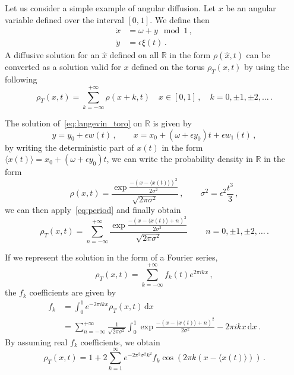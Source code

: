 Let us consider a simple example of angular diffusion. Let \(x\) be an angular variable defined over the interval \([0,1]\). We define then
\begin{equation}
	\begin{aligned}
		\dot{x} &= \omega + y \mod{1}\,, \\
		\dot{y} &= \epsilon\xi(t)	\,.
	\end{aligned}
	\label{eq:langevin_toro}
\end{equation}
A diffusive solution for an \(\hat{x}\) defined on all \(\mathbb{R}\) in the form \(\rho(\hat{x},t)\) can be converted as a solution valid for \(x\) defined on the torus \(\rho_T(x,t)\) by using the following 
\begin{equation}
	\rho_T(x,t) = \sum_{k=-\infty}^{+\infty} \rho(x+k,t) \quad x\in[0,1]\,,\quad k = 0,\pm 1, \pm 2, \ldots \,.
 \label{eq:period}
\end{equation}

The solution of~\eqref{eq:langevin_toro} on \(\mathbb{R}\) is given by
\begin{equation}
	y = y_0 + \epsilon w(t)\,, \qquad x = x_0 + (\omega + \epsilon y_0) t + \epsilon w_1(t) \,,
\end{equation}
by writing the deterministic part of \(x(t)\) in the form \(\langle x(t) \rangle = x_0 + (\omega + \epsilon y_0) t\), we can write the probability density in \(\mathbb{R}\) in the form
\begin{equation}
	\rho(x,t) = \frac{\exp{\frac{-(x-\langle x(t)\rangle)^2}{2\sigma^2}}}{\sqrt{2\pi\sigma^2}}\,, \qquad \sigma^2 = \epsilon^2 \frac{t^3}{3}\,,
\end{equation}
we can then apply~\eqref{eq:period} and finally obtain
\begin{equation}
	\rho_T(x,t) = \sum_{n=-\infty}^{+\infty} \frac{\exp{\frac{-(x-\langle x(t)\rangle + n)^2}{2\sigma^2}}}{\sqrt{2\pi\sigma^2}} \,\qquad n = 0,\pm 1, \pm 2, \ldots\,.
\end{equation}

If we represent the solution in the form of a Fourier series,
\begin{equation}
	\rho_T(x,t) = \sum_{k=-\infty}^{+\infty} f_k(t)e^{2\pi i k x} \,,
\end{equation}
the \(f_k\) coefficients are given by
\begin{align}
	f_k &= \int_0^1 e^{-2\pi i k x} \rho_T(x,t)\,\mathrm{d}x \\
	&= \sum_{n=-\infty}^{+\infty} \frac{1}{\sqrt{2\pi\sigma^2}} \int_0^1 \exp{\frac{-(x-\langle x(t) \rangle + n)^2}{2\sigma^2} -2\pi i k x}\,\mathrm{d}x \,.
\end{align}
By assuming real \(f_k\) coefficients, we obtain
\begin{equation}
	\rho_T(x,t) = 1+2\sum_{k=1}^\infty e^{-2\pi^2\sigma^2k^2} f_k \cos(2\pi k (x-\langle x(t) \rangle)) \,.
\end{equation}

